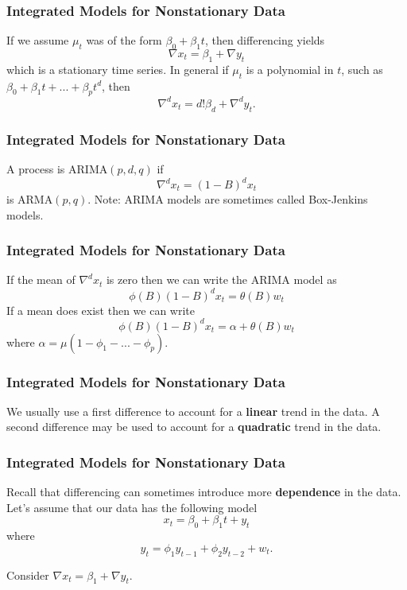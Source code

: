 \documentclass[%
xcolor=pdftex]{beamer}
\begin{document}
\begin{frame}
\frametitle{Integrated Models for Nonstationary Data}

If we assume $\mu_t$ was of the form $\beta_0+\beta_1 t$, then differencing yields
$$
\nabla x_t =\beta_1 + \nabla y_t
$$
which is a stationary time series.  In general if $\mu_t$ is a polynomial in $t$, such as $\beta_0+\beta_1 t+...+\beta_p t^d$, then
$$
\nabla^d x_t =d! \beta_d + \nabla^d y_t.
$$

\end{frame}

\begin{frame}
\frametitle{Integrated Models for Nonstationary Data}

A process is ARIMA$(p,d,q)$ if
$$
\nabla^d x_t=(1-B)^d x_t
$$
is ARMA$(p,q)$. Note: ARIMA models are sometimes called Box-Jenkins models.

\end{frame}

\begin{frame}
\frametitle{Integrated Models for Nonstationary Data}

If the mean of $\nabla^d x_t$ is zero then we can write the ARIMA model as
\begin{equation}
\phi(B)(1-B)^d x_t = \theta(B) w_t
\end{equation}
If a mean does exist then we can write
\begin{equation}
\phi(B)(1-B)^d x_t = \alpha + \theta(B) w_t
\end{equation}
where $\alpha=\mu(1-\phi_1-...-\phi_p)$.

\end{frame}

\begin{frame}
\frametitle{Integrated Models for Nonstationary Data}

We usually use a first difference to account for a \textbf{linear} trend in the data. A second difference may be used to account for a \textbf{quadratic} trend in the data.

\end{frame}

\begin{frame}
\frametitle{Integrated Models for Nonstationary Data}

Recall that differencing can sometimes introduce more \textbf{dependence} in the data. Let's assume that our data has the following model
$$
x_t =\beta_0+\beta_1 t + y_t
$$
where
$$
y_t=\phi_1 y_{t-1}+\phi_2 y_{t-2}+w_t.
$$

Consider $\nabla x_t=\beta_1+ \nabla y_t$.

\end{frame}
\end{document}
